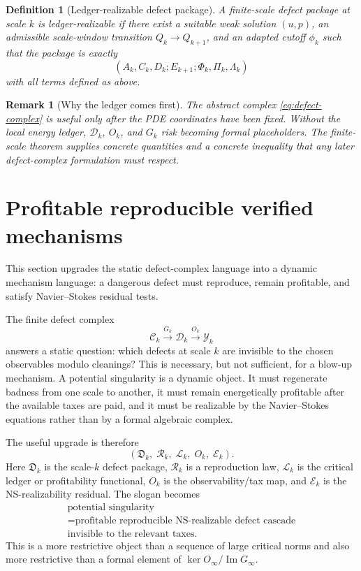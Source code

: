 \documentclass[11pt]{article}
\numberwithin{equation}{section}
\newtheorem{definition}[theorem]{Definition}
\newtheorem{remark}[theorem]{Remark}
\newcommand{\calC}{\mathcal C}
\newcommand{\calD}{\mathcal D}
\newcommand{\calY}{\mathcal Y}
\newcommand{\calE}{\mathcal E}
\newcommand{\calL}{\mathcal L}
\newcommand{\calR}{\mathcal R}
\newcommand{\Image}{\operatorname{Im}}
\begin{document}
\begin{definition}[Ledger-realizable defect package]
A finite-scale defect package at scale $k$ is ledger-realizable if there exist a suitable weak solution $(u,p)$, an admissible scale-window transition $Q_k\to Q_{k+1}$, and an adapted cutoff $\phi_k$ such that the package is exactly
\[
    (A_k,C_k,D_k;E_{k+1};\Phi_k,\Pi_k,\Lambda_k)
\]
with all terms defined as above.
\end{definition}

\begin{remark}[Why the ledger comes first]
The abstract complex \eqref{eq:defect-complex} is useful only after the PDE coordinates have been fixed.  Without the local energy ledger, $\calD_k$, $O_k$, and $G_k$ risk becoming formal placeholders.  The finite-scale theorem supplies concrete quantities and a concrete inequality that any later defect-complex formulation must respect.
\end{remark}


\section{Profitable reproducible verified mechanisms}\label{sec:dynamic-mechanism}
\noindent This section upgrades the static defect-complex language into a dynamic mechanism language: a dangerous defect must reproduce, remain profitable, and satisfy Navier--Stokes residual tests.

The finite defect complex
\[
    \calC_k\xrightarrow{G_k}\calD_k\xrightarrow{O_k}\calY_k
\]
answers a static question: which defects at scale $k$ are invisible to the chosen observables modulo cleanings?  This is necessary, but not sufficient, for a blow-up mechanism.  A potential singularity is a dynamic object.  It must regenerate badness from one scale to another, it must remain energetically profitable after the available taxes are paid, and it must be realizable by the Navier--Stokes equations rather than by a formal algebraic complex.

The useful upgrade is therefore
\begin{equation}\label{eq:dynamic-five-tuple}
    \boxed{
    (\mathfrak D_k,\;\calR_k,\;\calL_k,\;O_k,\;\calE_k).
    }
\end{equation}
Here $\mathfrak D_k$ is the scale-$k$ defect package, $\calR_k$ is a reproduction law, $\calL_k$ is the critical ledger or profitability functional, $O_k$ is the observability/tax map, and $\calE_k$ is the NS-realizability residual.  The slogan becomes
\[
\boxed{\begin{gathered}
\text{potential singularity}\\
=\text{profitable reproducible NS-realizable defect cascade}\\
\text{invisible to the relevant taxes.}
\end{gathered}}
\]
This is a more restrictive object than a sequence of large critical norms and also more restrictive than a formal element of $\ker O_\infty/\Image G_\infty$.
\end{document}
